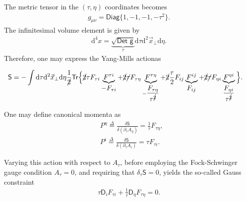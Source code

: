\begin{note}
The metric tensor in the $(\tau,\eta)$ coordinates becomes
\begin{align*}
    g_{\mu\nu}=\textsf{Diag}\{1, -1, -1, -\tau^2\}.
\end{align*}
The infinitesimal volume element is given by
\begin{align*}
    \mathrm{d}^4 x=\underbrace{\sqrt{\textsf{Det}\textsf{ g}}}_{\textstyle\tau}\mathrm{d}\tau\mathrm{d}^2\vec{x}_\perp\mathrm{d}\eta.
\end{align*}
Therefore, one may express the Yang-Mills actionas
\begin{fullwidth}
\begin{align*}
    \textsf{S}&=-\int\mathrm{d}\tau\mathrm{d}^2\vec{x}_\perp\mathrm{d}\eta\frac{1}{\cancel{2}}\textsf{Tr}\Big\{\cancel{2}\tau F_{\tau i}\underbrace{F^{\tau i}}_{\textstyle-F_{\tau i}}+\cancel{2}\cancel{\tau}F_{\tau\eta}\underbrace{F^{\tau\eta}}_{-\dfrac{F_{\tau\eta}}{\tau^{\cancel{2}}}}+\cancel{2}\frac{\tau}{2}F_{ij}\underbrace{F^{ij}}_{\textstyle F_{ij}}+\cancel{2}\cancel{\tau}F_{\eta i}\underbrace{F^{\eta i}}_{\dfrac{F_{\eta i}}{\tau^{\cancel{2}}}}\Big\}.
\end{align*}
\end{fullwidth}
\end{note}

One may define canonical momenta as
\begin{equation}\label{sglasma16}
\begin{aligned}
    & P^\eta\overset{\Delta}{=}\frac{\delta\textsf{S}}{\delta(\partial_\tau A_\eta)}=\frac{1}{\tau}F_{\tau\eta},\\
    & P^i\overset{\Delta}{=}\frac{\delta\textsf{S}}{\delta(\partial_\tau A_i)}=\tau F_{\tau i}.
\end{aligned}
\end{equation}

Varying this action with respect to $A_\tau$, before employing the Fock-Schwinger gauge condition $A_\tau=0$, and requiring that $\delta_\tau\textsf{S}=0$, yields the so-called Gauss constraint
\begin{align}\label{sglasma17}
    \tau\textsf{D}_iF_{\tau i}+\frac{1}{\tau}\textsf{D}_\eta F_{\tau\eta}=0.
\end{align}

